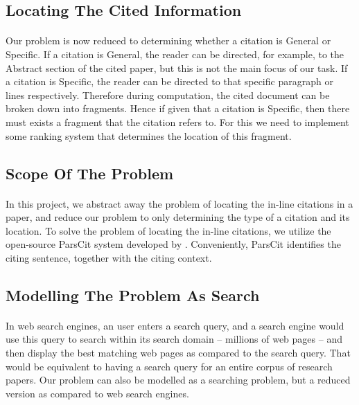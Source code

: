 \subsection{Locating The Cited Information}
\paragraph{}
Our problem is now reduced to determining whether a citation is General or Specific. If a citation is General, the reader can be directed, for example, to the Abstract section of the cited paper, but this is not the main focus of our task. If a citation is Specific, the reader can be directed to that specific paragraph or lines respectively. Therefore during computation, the cited document can be broken down into fragments. Hence if given that a citation is Specific, then there must exists a fragment that the citation refers to. For this we need to implement some ranking system that determines the location of this fragment.

\subsection{Scope Of The Problem}
\paragraph{}
In this project, we abstract away the problem of locating the in-line citations in a paper, and reduce our problem to only determining the type of a citation and its location. To solve the problem of locating the in-line citations, we utilize the open-source ParsCit system developed by \cite{parscit}. Conveniently, ParsCit identifies the citing sentence, together with the citing context.

\subsection{Modelling The Problem As Search}
\paragraph{}
In web search engines, an user enters a search query, and a search engine would use this query to search within its search domain -- millions of web pages -- and then display the best matching web pages as compared to the search query. That would be equivalent to having a search query for an entire corpus of research papers. Our problem can also be modelled as a searching problem, but a reduced version as compared to web search engines.

